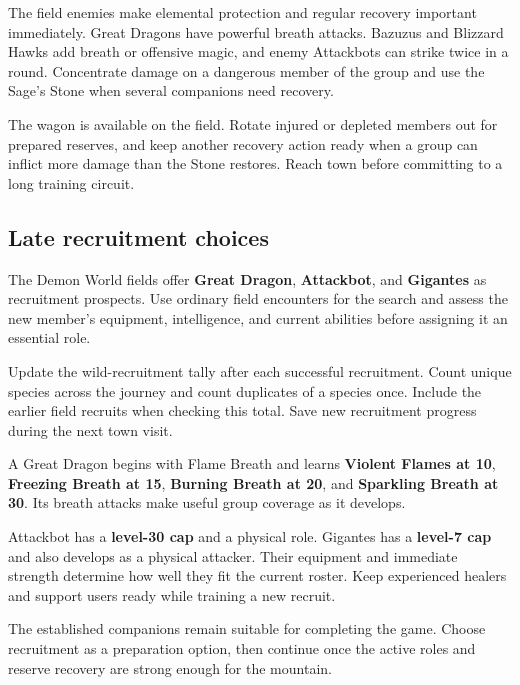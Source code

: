 The field enemies make elemental protection and regular recovery
important immediately. Great Dragons have powerful breath attacks.
Bazuzus and Blizzard Hawks add breath or offensive magic, and enemy
Attackbots can strike twice in a round. Concentrate damage on a
dangerous member of the group and use the Sage's Stone when several
companions need recovery.

The wagon is available on the field. Rotate injured or depleted
members out for prepared reserves, and keep another recovery action
ready when a group can inflict more damage than the Stone restores.
Reach town before committing to a long training circuit.

\subsection*{Late recruitment choices}

The Demon World fields offer \textbf{Great Dragon},
\textbf{Attackbot}, and \textbf{Gigantes} as recruitment
prospects. Use ordinary field encounters for the search and assess
the new member's equipment, intelligence, and current abilities
before assigning it an essential role.

Update the wild-recruitment tally after each successful recruitment.
Count unique species across the journey and count duplicates of a
species once. Include the earlier field recruits when checking this
total. Save new recruitment progress during the next town visit.


A Great Dragon begins with Flame Breath and learns
\textbf{Violent Flames at 10}, \textbf{Freezing Breath at 15},
\textbf{Burning Breath at 20}, and \textbf{Sparkling Breath at 30}.
Its breath attacks make useful group coverage as it develops.

Attackbot has a \textbf{level-30 cap} and a physical role.
Gigantes has a \textbf{level-7 cap} and also develops as a
physical attacker. Their equipment and immediate strength determine
how well they fit the current roster. Keep experienced healers
and support users ready while training a new recruit.

The established companions remain suitable for completing the game.
Choose recruitment as a preparation option, then continue once the
active roles and reserve recovery are strong enough for the mountain.

